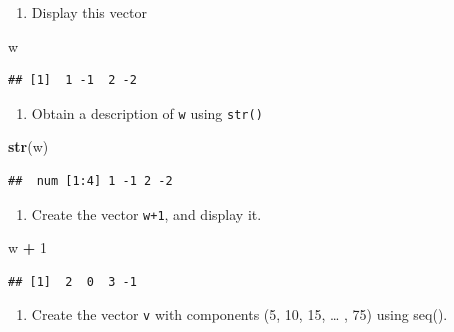\documentclass[
]{book}
\newenvironment{Shaded}{\begin{snugshade}}{\end{snugshade}}
\newcommand{\DecValTok}[1]{\textcolor[rgb]{0.00,0.00,0.81}{#1}}
\newcommand{\FunctionTok}[1]{\textcolor[rgb]{0.13,0.29,0.53}{\textbf{#1}}}
\newcommand{\NormalTok}[1]{#1}
\newcommand{\SpecialCharTok}[1]{\textcolor[rgb]{0.81,0.36,0.00}{\textbf{#1}}}
\providecommand{\tightlist}{%
  \setlength{\itemsep}{0pt}\setlength{\parskip}{0pt}}
\theoremstyle{definition}
\theoremstyle{definition}
\theoremstyle{definition}
\theoremstyle{definition}
\theoremstyle{remark}
\begin{document}
\begin{enumerate}
\def\labelenumi{\arabic{enumi}.}
\setcounter{enumi}{1}
\tightlist
\item
  Display this vector
\end{enumerate}

\begin{Shaded}
\begin{Highlighting}[]
\NormalTok{w}
\end{Highlighting}
\end{Shaded}

\begin{verbatim}
## [1]  1 -1  2 -2
\end{verbatim}

\begin{enumerate}
\def\labelenumi{\arabic{enumi}.}
\setcounter{enumi}{2}
\tightlist
\item
  Obtain a description of \texttt{w} using \texttt{str()}
\end{enumerate}

\begin{Shaded}
\begin{Highlighting}[]
\FunctionTok{str}\NormalTok{(w)}
\end{Highlighting}
\end{Shaded}

\begin{verbatim}
##  num [1:4] 1 -1 2 -2
\end{verbatim}

\begin{enumerate}
\def\labelenumi{\arabic{enumi}.}
\setcounter{enumi}{3}
\tightlist
\item
  Create the vector \texttt{w+1}, and display it.
\end{enumerate}

\begin{Shaded}
\begin{Highlighting}[]
\NormalTok{w }\SpecialCharTok{+} \DecValTok{1}
\end{Highlighting}
\end{Shaded}

\begin{verbatim}
## [1]  2  0  3 -1
\end{verbatim}

\begin{enumerate}
\def\labelenumi{\arabic{enumi}.}
\setcounter{enumi}{4}
\tightlist
\item
  Create the vector \texttt{v} with components (5, 10, 15, \ldots{} , 75) using seq().
\end{enumerate}
\end{document}
